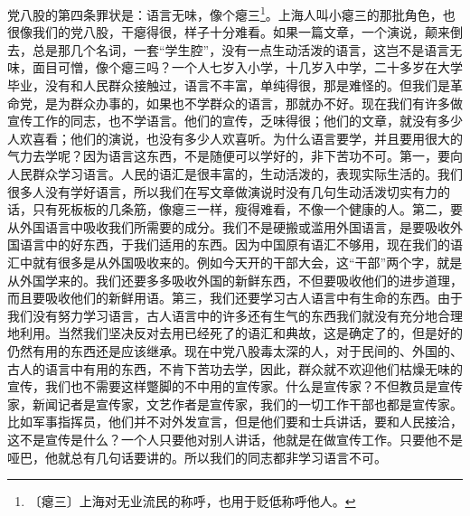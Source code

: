 \documentclass[12pt,UTF-8,openany]{ctexbook}
\begin{document}
\begin{normalsize}
    党八股的第四条罪状是：语言无味，像个瘪三\footnote{〔瘪三〕上海对无业流民的称呼，也用于贬低称呼他人。}。上海人叫小瘪三的那批角色，也很像我们的党八股，干瘪得很，样子十分难看。如果一篇文章，一个演说，颠来倒去，总是那几个名词，一套“学生腔”，没有一点生动活泼的语言，这岂不是语言无味，面目可憎，像个瘪三吗？一个人七岁入小学，十几岁入中学，二十多岁在大学毕业，没有和人民群众接触过，语言不丰富，单纯得很，那是难怪的。但我们是革命党，是为群众办事的，如果也不学群众的语言，那就办不好。现在我们有许多做宣传工作的同志，也不学语言。他们的宣传，乏味得很；他们的文章，就没有多少人欢喜看；他们的演说，也没有多少人欢喜听。为什么语言要学，并且要用很大的气力去学呢？因为语言这东西，不是随便可以学好的，非下苦功不可。第一，要向人民群众学习语言。人民的语汇是很丰富的，生动活泼的，表现实际生活的。我们很多人没有学好语言，所以我们在写文章做演说时没有几句生动活泼切实有力的话，只有死板板的几条筋，像瘪三一样，瘦得难看，不像一个健康的人。第二，要从外国语言中吸收我们所需要的成分。我们不是硬搬或滥用外国语言，是要吸收外国语言中的好东西，于我们适用的东西。因为中国原有语汇不够用，现在我们的语汇中就有很多是从外国吸收来的。例如今天开的干部大会，这“干部”两个字，就是从外国学来的。我们还要多多吸收外国的新鲜东西，不但要吸收他们的进步道理，而且要吸收他们的新鲜用语。第三，我们还要学习古人语言中有生命的东西。由于我们没有努力学习语言，古人语言中的许多还有生气的东西我们就没有充分地合理地利用。当然我们坚决反对去用已经死了的语汇和典故，这是确定了的，但是好的仍然有用的东西还是应该继承。现在中党八股毒太深的人，对于民间的、外国的、古人的语言中有用的东西，不肯下苦功去学，因此，群众就不欢迎他们枯燥无味的宣传，我们也不需要这样蹩脚的不中用的宣传家。什么是宣传家？不但教员是宣传家，新闻记者是宣传家，文艺作者是宣传家，我们的一切工作干部也都是宣传家。比如军事指挥员，他们并不对外发宣言，但是他们要和士兵讲话，要和人民接洽，这不是宣传是什么？一个人只要他对别人讲话，他就是在做宣传工作。只要他不是哑巴，他就总有几句话要讲的。所以我们的同志都非学习语言不可。
    

\end{normalsize}
\end{document}
